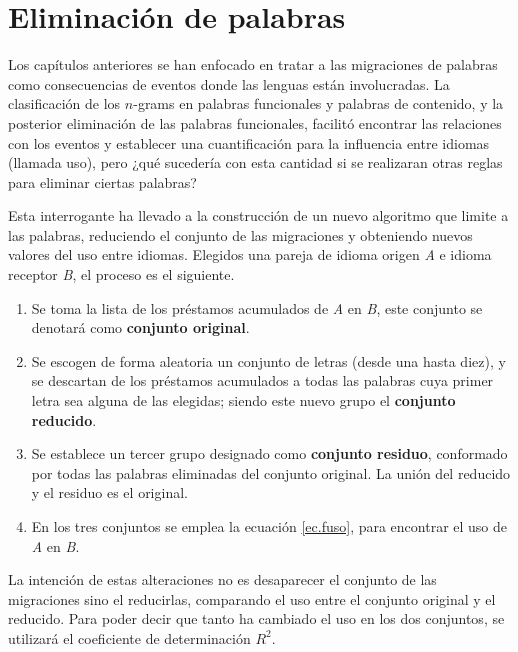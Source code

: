 \chapter{Eliminación de palabras}


Los capítulos anteriores se han enfocado en tratar a las migraciones de palabras como consecuencias de eventos donde  las lenguas están involucradas. La clasificación de los $n$-grams en palabras funcionales y palabras de contenido, y la posterior eliminación de las palabras funcionales, facilitó encontrar las relaciones con los eventos y establecer una cuantificación para la influencia entre idiomas (llamada uso), pero ¿qué sucedería con esta cantidad si se realizaran otras reglas para eliminar ciertas palabras?

Esta interrogante ha llevado a la construcción de un nuevo algoritmo que limite a las palabras,  reduciendo el conjunto de las migraciones y obteniendo nuevos valores del uso entre idiomas.  Elegidos una pareja de idioma origen \textit{A} e idioma receptor \textit{B}, el proceso es el siguiente. 


\begin{enumerate}
	
	\item Se toma la lista de los préstamos acumulados de \textit{A} en \textit{B},  este conjunto se denotará como \textbf{conjunto original}.
		
	\item Se escogen de forma aleatoria un conjunto de letras (desde una hasta diez), y se descartan de los préstamos acumulados a todas las palabras cuya primer letra sea alguna de las elegidas; siendo este nuevo grupo el \textbf{conjunto reducido}.
	
	\item Se establece un tercer grupo designado como \textbf{conjunto residuo}, conformado por todas las palabras eliminadas del conjunto original.  La unión del reducido y el residuo es el original. 
	
	\item En los tres conjuntos se emplea la ecuación \ref{ec.fuso}, para encontrar el uso de \textit{A} en \textit{B}. 	
	 
\end{enumerate}

La intención de estas alteraciones no es desaparecer el conjunto de las migraciones sino el reducirlas,   comparando el uso entre el conjunto original y el reducido.  Para poder decir que tanto ha cambiado el uso en los dos conjuntos, se utilizará el coeficiente de determinación $R^{2}$. 

